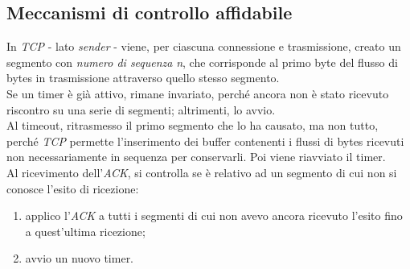\subsection{Meccanismi di controllo affidabile}
In \textit{TCP} - lato \textit{sender} - viene, per ciascuna connessione e trasmissione, creato un segmento con \textit{numero di sequenza} \textit{n}, che corrisponde al primo byte del flusso di bytes in trasmissione attraverso quello stesso segmento. \\
Se un timer è già attivo, rimane invariato, perché ancora non è stato ricevuto riscontro su una serie di segmenti; altrimenti, lo avvio. \\
Al timeout, ritrasmesso il primo segmento che lo ha causato, ma non tutto, perché \textit{TCP} permette l'inserimento dei buffer contenenti i flussi di bytes ricevuti non necessariamente in sequenza per conservarli. Poi viene riavviato il timer. \\
Al ricevimento dell'\textit{ACK}, si controlla se è relativo ad un segmento di cui non si conosce l'esito di ricezione:
\begin{enumerate}
    \item applico l'\textit{ACK} a tutti i segmenti di cui non avevo ancora ricevuto l'esito fino a quest'ultima ricezione;
    \item avvio un nuovo timer.
\end{enumerate}

